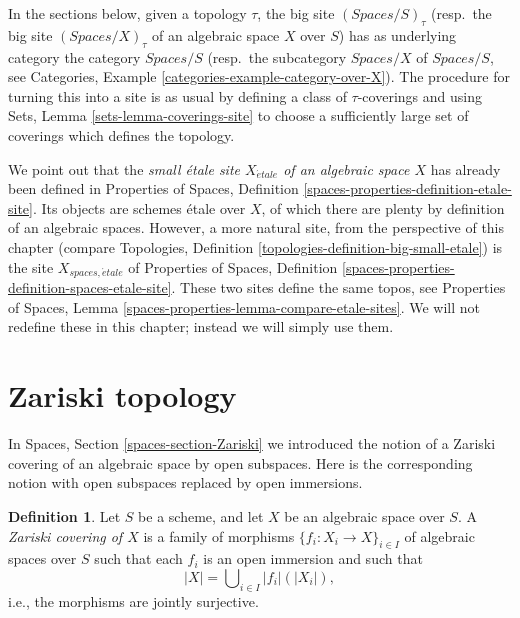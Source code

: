 \documentclass{stacks-project}
\theoremstyle{plain}
\theoremstyle{definition}
\newtheorem{definition}[subsection]{Definition}
\theoremstyle{remark}
\numberwithin{equation}{subsection}
\def\etale{{\acute{e}tale}}
\begin{document}
\medskip\noindent
In the sections below, given a topology $\tau$, the big site
$(\textit{Spaces}/S)_\tau$ (resp.\ the big site $(\textit{Spaces}/X)_\tau$
of an algebraic space $X$ over $S$)
has as underlying category the category $\textit{Spaces}/S$
(resp.\ the subcategory $\textit{Spaces}/X$ of $\textit{Spaces}/S$, see
Categories, Example \ref{categories-example-category-over-X}).
The procedure for turning this into a site is as usual by defining a
class of $\tau$-coverings and using
Sets, Lemma \ref{sets-lemma-coverings-site}
to choose a sufficiently large set of coverings which defines the topology.

\medskip\noindent
We point out that the {\it small \'etale site $X_\etale$
of an algebraic space $X$} has already been defined in
Properties of Spaces, Definition
\ref{spaces-properties-definition-etale-site}.
Its objects are schemes \'etale over $X$, of which there are plenty
by definition of an algebraic spaces. However,
a more natural site, from the perspective of this chapter (compare
Topologies, Definition \ref{topologies-definition-big-small-etale})
is the site $X_{spaces, \etale}$ of
Properties of Spaces, Definition
\ref{spaces-properties-definition-spaces-etale-site}.
These two sites define the same topos, see
Properties of Spaces, Lemma \ref{spaces-properties-lemma-compare-etale-sites}.
We will not redefine these in this chapter; instead we will simply
use them.






\section{Zariski topology}
\label{section-zariski}

\noindent
In
Spaces, Section \ref{spaces-section-Zariski}
we introduced the notion of a Zariski covering of an algebraic space by
open subspaces. Here is the corresponding notion with open subspaces
replaced by open immersions.

\begin{definition}
\label{definition-zariski-covering}
Let $S$ be a scheme, and let $X$ be an algebraic space over $S$.
A {\it Zariski covering of $X$} is a family of morphisms
$\{f_i : X_i \to X\}_{i \in I}$ of algebraic spaces over $S$
such that each $f_i$ is an open immersion
and such that
$$
|X| = \bigcup\nolimits_{i \in I} |f_i|(|X_i|),
$$
i.e., the morphisms are jointly surjective.
\end{definition}
\end{document}
